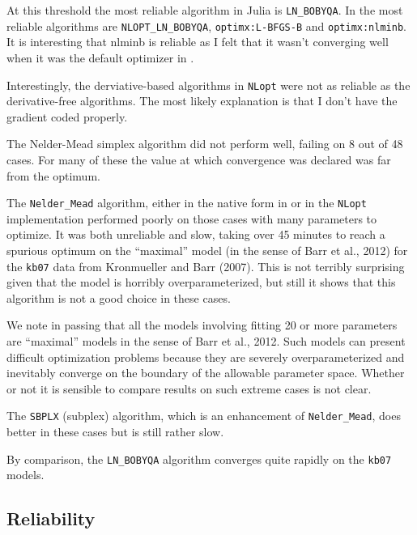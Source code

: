 \documentclass[article]{jss}
\begin{document}
    At this threshold the most reliable algorithm in Julia is
\texttt{LN\_BOBYQA}. In  the most reliable algorithms are
\texttt{NLOPT\_LN\_BOBYQA}, \texttt{optimx:L-BFGS-B} and
\texttt{optimx:nlminb}. It is interesting that nlminb is reliable as I
felt that it wasn't converging well when it was the default optimizer in
.

Interestingly, the derviative-based algorithms in \texttt{NLopt} were
not as reliable as the derivative-free algorithms. The most likely
explanation is that I don't have the gradient coded properly.

The Nelder-Mead simplex algorithm did not perform well, failing on 8 out
of 48 cases. For many of these the value at which convergence was
declared was far from the optimum.





 The \texttt{Nelder\_Mead} algorithm, either in the native form in
 or in the \texttt{NLopt} implementation performed poorly
on those cases with many parameters to optimize. It was both unreliable
and slow, taking over 45 minutes to reach a spurious optimum on the
``maximal'' model (in the sense of Barr et al., 2012) for the
\texttt{kb07} data from Kronmueller and Barr (2007). This is not
terribly surprising given that the model is horribly overparameterized,
but still it shows that this algorithm is not a good choice in these
cases.

We note in passing that all the models involving fitting 20 or more
parameters are ``maximal'' models in the sense of Barr et al., 2012.
Such models can present difficult optimization problems because they are
severely overparameterized and inevitably converge on the boundary of
the allowable parameter space. Whether or not it is sensible to compare
results on such extreme cases is not clear.

The \texttt{SBPLX} (subplex) algorithm, which is an enhancement of
\texttt{Nelder\_Mead}, does better in these cases but is still rather
slow.



  
    By comparison, the \texttt{LN\_BOBYQA} algorithm converges quite rapidly
on the \texttt{kb07} models.

        
        
        


\subsection[Reliablility]{Reliability}
\end{document}
